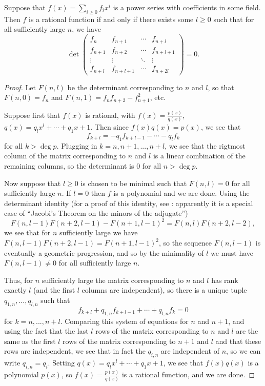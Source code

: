 \begin{lem} Suppose that $f(x) = \sum_{i \ge 0} f_ix^i$ is a power series with coefficients in some field. Then $f$ is a rational function if and only if there exists some $l \ge 0$ such that for all sufficiently large $n$, we have
\[
\det\begin{pmatrix}f_n & f_{n+1} & \cdots & f_{n+l} \\ f_{n+1} & f_{n+2} & \cdots & f_{n+l+1}\\ \vdots & \vdots & \ddots & \vdots \\ f_{n+l} & f_{n+l+1} & \cdots & f_{n+2l}\end{pmatrix} = 0.
\]
\end{lem}
\begin{proof} Let $F(n,l)$ be the determinant corresponding to $n$ and $l$, so that $F(n,0) = f_n$ and $F(n,1) = f_nf_{n+2} - f_{n+1}^2$, etc.

Suppose first that $f(x)$ is rational, with $f(x) = \frac{p(x)}{q(x)}$, $q(x) = q_lx^l + \cdots + q_1x + 1$. Then since $f(x)q(x) = p(x)$, we see that
\[
f_{k+l} = -q_1f_{k+l-1} - \cdots - q_lf_{k}
\]
for all $k > \deg p$. Plugging in $k = n, n+1, ..., n+l$, we see that the rigtmost column of the matrix corresponding to $n$ and $l$ is a linear combination of the remaining columns, so the determinant is $0$ for all $n > \deg p$.

Now suppose that $l \ge 0$ is chosen to be minimal such that $F(n,l) = 0$ for all sufficiently large $n$. If $l=0$ then $f$ is a polynomial and we are done. Using the determinant identity (for a proof of this identity, see \cite{local-fields}: apparently it is a special case of ``Jacobi's Theorem on the minors of the adjugate'')
\[
F(n,l-1)F(n+2,l-1) - F(n+1,l-1)^2 = F(n,l)F(n+2,l-2),
\]
we see that for $n$ sufficiently large we have $F(n,l-1)F(n+2,l-1) = F(n+1,l-1)^2$, so the sequence $F(n,l-1)$ is eventually a geometric progression, and so by the minimality of $l$ we must have $F(n,l-1) \ne 0$ for all sufficiently large $n$.

Thus, for $n$ sufficiently large the matrix corresponding to $n$ and $l$ has rank exactly $l$ (and the first $l$ columns are independent), so there is a unique tuple $q_{1,n}, ..., q_{l,n}$ such that
\[
f_{k+l} + q_{1,n}f_{k+l-1} + \cdots + q_{l,n}f_k = 0
\]
for $k = n, ..., n+l$. Comparing this system of equations for $n$ and $n+1$, and using the fact that the last $l$ rows of the matrix corresponding to $n$ and $l$ are the same as the first $l$ rows of the matrix corresponding to $n+1$ and $l$ and that these rows are independent, we see that in fact the $q_{i,n}$ are independent of $n$, so we can write $q_{i,n} = q_i$. Setting $q(x) = q_lx^l + \cdots + q_1x + 1$, we see that $f(x)q(x)$ is a polynomial $p(x)$, so $f(x) = \frac{p(x)}{q(x)}$ is a rational function, and we are done.
\end{proof}

